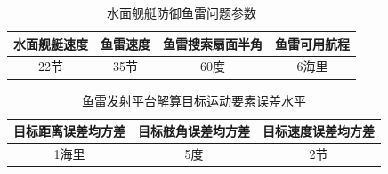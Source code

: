 \documentclass[12pt]{article}%
\begin{document}
\begin{table}[h]
  \centering{}
  \caption{\heiti{}水面舰艇防御鱼雷问题参数}
\begin{tabular}{c|c|c|c}
\hline
水面舰艇速度 & 鱼雷速度 & 鱼雷搜索扇面半角 & 鱼雷可用航程 \bigstrut[b]\\
\hline
22节 & 35节 & 60度 & 6海里 \bigstrut[t]\\
\hline
\end{tabular}%
\label{tab:addlabel3}%
\end{table}%
\begin{table}[h]
  \centering{}
  \caption{\heiti{}鱼雷发射平台解算目标运动要素误差水平}
\begin{tabular}{c|c|c}
\hline
目标距离误差均方差 & 目标舷角误差均方差 & 目标速度误差均方差 \bigstrut[b]\\
\hline
1海里 & 5度 & 2节 \bigstrut[t]\\
\hline
\end{tabular}%
\label{tab:addlabel2}%
\end{table}%
\end{document}
